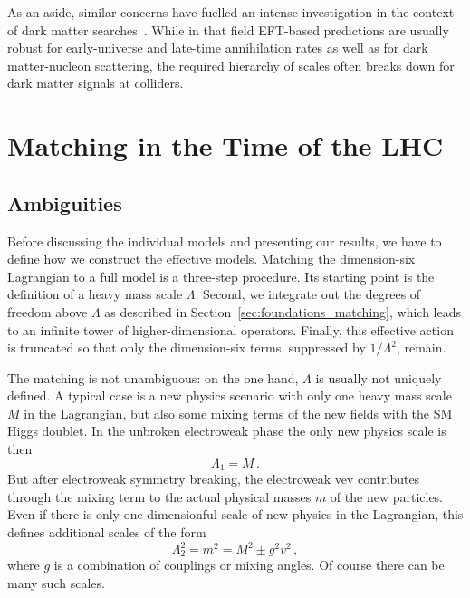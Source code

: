 As an aside, similar concerns have fuelled an intense investigation in
the context of dark matter searches~\cite{Shoemaker:2011vi,
  Busoni:2013lha, Buchmueller:2013dya, Busoni:2014sya, Racco:2015dxa,
  Bauer:2016pug}.  While in that field EFT-based predictions are
usually robust for early-universe and late-time annihilation rates as
well as for dark matter-nucleon scattering, the required hierarchy of
scales often breaks down for dark matter signals at colliders.



\section{Matching in the Time of the LHC}
\label{sec:validity_matching}

\subsection{Ambiguities}

Before discussing the individual models and presenting our results, we
have to define how we construct the effective models.  Matching the
dimension-six Lagrangian to a full model is a three-step procedure.
Its starting point is the definition of a heavy mass scale $\Lambda$.
Second, we integrate out the degrees of freedom above $\Lambda$ as
described in Section~\ref{sec:foundations_matching}, which leads to an
infinite tower of higher-dimensional operators.  Finally, this
effective action is truncated so that only the dimension-six terms,
suppressed by $1 / \Lambda^2$, remain.

The matching is not unambiguous: on the one hand, $\Lambda$ is usually
not uniquely defined. A typical case is a new physics scenario with
only one heavy mass scale $M$ in the Lagrangian, but also some mixing
terms of the new fields with the SM Higgs doublet. In the unbroken
electroweak phase the only new physics scale is then
%
\begin{equation}
  \Lambda_1 = M \,.
\end{equation}
%
But after electroweak symmetry breaking, the electroweak vev
contributes through the mixing term to the actual physical masses $m$
of the new particles. Even if there is only one dimensionful scale of
new physics in the Lagrangian, this defines additional scales of the
form
%
\begin{equation}
  \Lambda_2^2 = m^2 = M^2 \pm g^2 v^2 \,,
\end{equation}
%
where $g$ is a combination of couplings or mixing angles. Of course
there can be many such scales.

